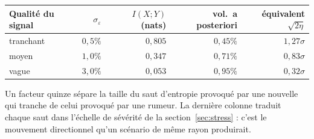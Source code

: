 \documentclass[11pt]{article}
\theoremstyle{definition}
\theoremstyle{remark}
\begin{document}
\begin{center}
\small
\begin{tabular}{@{}lrrrr@{}}
\toprule
Qualité du signal & $\sigma_\varepsilon$ & $I(X;Y)$ (nats) & vol.\ a posteriori & équivalent $\sqrt{2\eta}$ \\
\midrule
tranchant   & $0{,}5\%$ & $0{,}805$ & $0{,}45\%$ & $1{,}27\sigma$ \\
moyen       & $1{,}0\%$ & $0{,}347$ & $0{,}71\%$ & $0{,}83\sigma$ \\
vague       & $3{,}0\%$ & $0{,}053$ & $0{,}95\%$ & $0{,}32\sigma$ \\
\bottomrule
\end{tabular}
\end{center}

Un facteur quinze sépare la taille du saut d'entropie provoqué par une nouvelle
qui tranche de celui provoqué par une rumeur. La dernière colonne traduit chaque
saut dans l'échelle de sévérité de la section~\ref{sec:stress} : c'est le
mouvement directionnel qu'un scénario de même rayon produirait.
\end{document}
